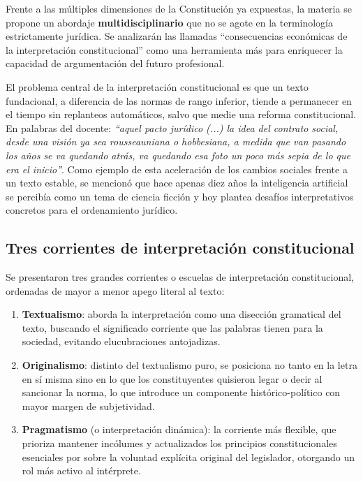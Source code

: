 \documentclass[12pt,oneside]{book}
\begin{document}
Frente a las múltiples dimensiones de la Constitución ya expuestas, la materia se propone un abordaje \textbf{multidisciplinario} que no se agote en la terminología estrictamente jurídica. Se analizarán las llamadas ``consecuencias económicas de la interpretación constitucional'' como una herramienta más para enriquecer la capacidad de argumentación del futuro profesional.

El problema central de la interpretación constitucional es que un texto fundacional, a diferencia de las normas de rango inferior, tiende a permanecer en el tiempo sin replanteos automáticos, salvo que medie una reforma constitucional. En palabras del docente: \textit{``aquel pacto jurídico (...) la idea del contrato social, desde una visión ya sea rousseauniana o hobbesiana, a medida que van pasando los años se va quedando atrás, va quedando esa foto un poco más sepia de lo que era el inicio''}. Como ejemplo de esta aceleración de los cambios sociales frente a un texto estable, se mencionó que hace apenas diez años la inteligencia artificial se percibía como un tema de ciencia ficción y hoy plantea desafíos interpretativos concretos para el ordenamiento jurídico.

\subsection{Tres corrientes de interpretación constitucional}

Se presentaron tres grandes corrientes o escuelas de interpretación constitucional, ordenadas de mayor a menor apego literal al texto:

\begin{enumerate}
    \item \textbf{Textualismo}: aborda la interpretación como una disección gramatical del texto, buscando el significado corriente que las palabras tienen para la sociedad, evitando elucubraciones antojadizas.
    \item \textbf{Originalismo}: distinto del textualismo puro, se posiciona no tanto en la letra en sí misma sino en lo que los constituyentes quisieron legar o decir al sancionar la norma, lo que introduce un componente histórico-político con mayor margen de subjetividad.
    \item \textbf{Pragmatismo} (o interpretación dinámica): la corriente más flexible, que prioriza mantener incólumes y actualizados los principios constitucionales esenciales por sobre la voluntad explícita original del legislador, otorgando un rol más activo al intérprete.
\end{enumerate}
\end{document}
